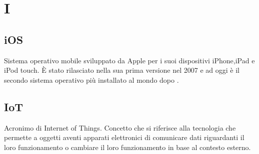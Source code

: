 \section*{I}
\markright{}
\subsection*{iOS}
Sistema operativo mobile sviluppato da Apple per i suoi dispositivi iPhone,iPad e iPod touch. È stato rilasciato nella sua prima versione nel 2007 e ad oggi è il secondo sistema operativo più installato al mondo dopo .
\subsection*{IoT}
Acronimo di Internet of Things. Concetto che si riferisce alla tecnologia che permette a oggetti aventi apparati elettronici di comunicare dati riguardanti il loro funzionamento o cambiare il loro funzionamento in base al contesto esterno. 